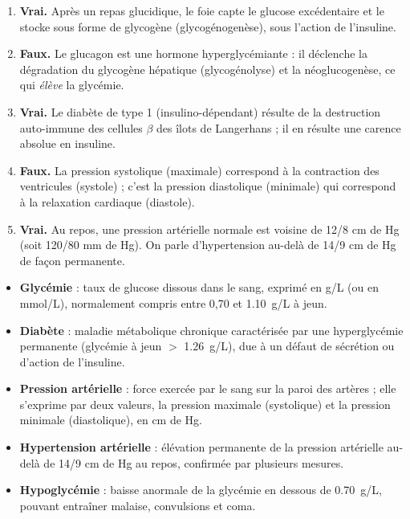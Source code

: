 \documentclass[11pt]{article}
\newcommand{\cle}[1]{{\popxbold\color{popdark}#1}}
\begin{document}
\begin{corrige}
\begin{enumerate}
\item \textbf{Vrai.} Après un repas glucidique, le foie capte le glucose excédentaire et le stocke sous forme de \cle{glycogène} (glycogénogenèse), sous l'action de l'insuline.
\item \textbf{Faux.} Le glucagon est une hormone \cle{hyperglycémiante} : il déclenche la dégradation du glycogène hépatique (glycogénolyse) et la néoglucogenèse, ce qui \emph{élève} la glycémie.
\item \textbf{Vrai.} Le diabète de type 1 (insulino-dépendant) résulte de la destruction \cle{auto-immune} des cellules $\beta$ des îlots de Langerhans ; il en résulte une carence absolue en insuline.
\item \textbf{Faux.} La pression systolique (maximale) correspond à la \cle{contraction} des ventricules (systole) ; c'est la pression diastolique (minimale) qui correspond à la relaxation cardiaque (diastole).
\item \textbf{Vrai.} Au repos, une pression artérielle normale est voisine de 12/8 cm de Hg (soit 120/80 mm de Hg). On parle d'hypertension au-delà de 14/9 cm de Hg de façon permanente.
\end{enumerate}
\end{corrige}

\begin{corrige}
\begin{itemize}
\item \textbf{Glycémie} : taux de glucose dissous dans le sang, exprimé en g/L (ou en mmol/L), normalement compris entre 0,70 et \SI{1,10}{g/L} à jeun.
\item \textbf{Diabète} : maladie métabolique chronique caractérisée par une hyperglycémie permanente (glycémie à jeun $>$ \SI{1,26}{g/L}), due à un défaut de sécrétion ou d'action de l'insuline.
\item \textbf{Pression artérielle} : force exercée par le sang sur la paroi des artères ; elle s'exprime par deux valeurs, la pression maximale (systolique) et la pression minimale (diastolique), en cm de Hg.
\item \textbf{Hypertension artérielle} : élévation permanente de la pression artérielle au-delà de 14/9 cm de Hg au repos, confirmée par plusieurs mesures.
\item \textbf{Hypoglycémie} : baisse anormale de la glycémie en dessous de \SI{0,70}{g/L}, pouvant entraîner malaise, convulsions et coma.
\end{itemize}
\end{corrige}
\end{document}
